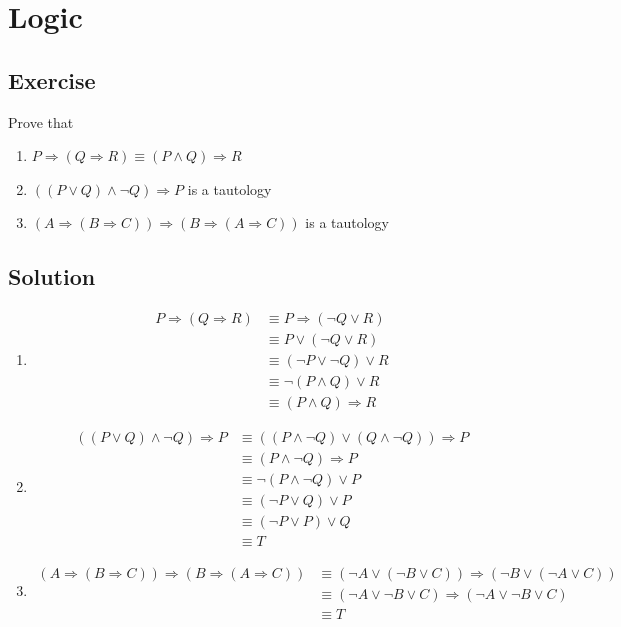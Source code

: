 \documentclass[12pt]{article}
\begin{document}
\section{Logic}
\subsection{Exercise}
\par Prove that 
\begin{enumerate}
	\item $P \Rightarrow (Q \Rightarrow R) \equiv (P \wedge Q) \Rightarrow R$
	\item $((P \vee Q) \wedge \neg Q) \Rightarrow P$ is a tautology
	\item $(A \Rightarrow (B \Rightarrow C)) \Rightarrow (B \Rightarrow (A \Rightarrow C))$ is a tautology
\end{enumerate}
\subsection{Solution}
\begin{enumerate}
	\item 
	\begin{equation*}
	\begin{aligned}
	P \Rightarrow (Q \Rightarrow R) &\equiv P \Rightarrow (\neg Q \vee R) \\
	&\equiv P \vee (\neg Q \vee R) \\
	&\equiv (\neg P \vee \neg Q) \vee R\\
	&\equiv \neg (P \wedge Q) \vee R\\
	&\equiv (P \wedge Q) \Rightarrow R
	\end{aligned}
	\end{equation*}
	\item 
	\begin{equation*}
	\begin{aligned}
	((P \vee Q) \wedge \neg Q) \Rightarrow P &\equiv ((P \wedge \neg Q) \vee (Q \wedge \neg Q)) \Rightarrow P\\
	&\equiv (P \wedge \neg Q) \Rightarrow P\\
	&\equiv \neg (P \wedge \neg Q) \vee P\\
	&\equiv (\neg P \vee Q) \vee P\\
	&\equiv (\neg P \vee P) \vee Q\\
	&\equiv T
	\end{aligned}
	\end{equation*}
	\item 
	\begin{equation*}
	\begin{aligned}
	(A \Rightarrow (B \Rightarrow C)) \Rightarrow (B \Rightarrow (A \Rightarrow C)) & \equiv (\neg A \vee (\neg B \vee C)) \Rightarrow (\neg B \vee (\neg A \vee C)) \\
	&\equiv (\neg A \vee \neg B \vee C) \Rightarrow (\neg A \vee \neg B \vee C)\\
	&\equiv T
	\end{aligned}
	\end{equation*}
\end{enumerate}
\end{document}
